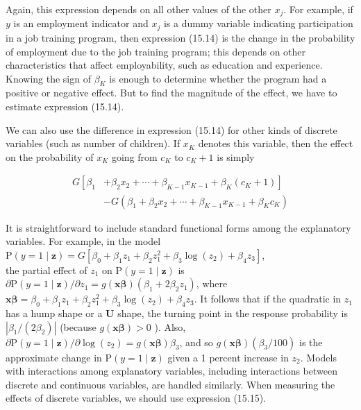 \documentclass[10pt]{article}
\begin{document}
Again, this expression depends on all other values of the other $x_{j}$. For example, if $y$ is an employment indicator and $x_{j}$ is a dummy variable indicating participation in a job training program, then expression (15.14) is the change in the probability of employment due to the job training program; this depends on other characteristics that affect employability, such as education and experience. Knowing the sign of $\beta_{K}$ is enough to determine whether the program had a positive or negative effect. But to find the magnitude of the effect, we have to estimate expression (15.14).

We can also use the difference in expression (15.14) for other kinds of discrete variables (such as number of children). If $x_{K}$ denotes this variable, then the effect on the probability of $x_{K}$ going from $c_{K}$ to $c_{K}+1$ is simply


\begin{align*}
G\left[\beta_{1}\right. & \left.+\beta_{2} x_{2}+\cdots+\beta_{K-1} x_{K-1}+\beta_{K}\left(c_{K}+1\right)\right] \\
& -G\left(\beta_{1}+\beta_{2} x_{2}+\cdots+\beta_{K-1} x_{K-1}+\beta_{K} c_{K}\right) \tag{15.15}
\end{align*}


It is straightforward to include standard functional forms among the explanatory variables. For example, in the model\\
$\mathrm{P}(y=1 \mid \mathbf{z})=G\left[\beta_{0}+\beta_{1} z_{1}+\beta_{2} z_{1}^{2}+\beta_{3} \log \left(z_{2}\right)+\beta_{4} z_{3}\right]$,\\
the partial effect of $z_{1}$ on $\mathrm{P}(y=1 \mid \mathbf{z})$ is $\partial \mathrm{P}(y=1 \mid \mathbf{z}) / \partial z_{1}=g(\mathbf{x} \boldsymbol{\beta})\left(\beta_{1}+2 \beta_{2} z_{1}\right)$, where $\mathbf{x} \boldsymbol{\beta}=\beta_{0}+\beta_{1} z_{1}+\beta_{2} z_{1}^{2}+\beta_{3} \log \left(z_{2}\right)+\beta_{4} z_{3}$. It follows that if the quadratic in $z_{1}$ has a hump shape or a $\mathbf{U}$ shape, the turning point in the response probability is $\left|\beta_{1} /\left(2 \beta_{2}\right)\right|$ (because $g(\mathbf{x} \boldsymbol{\beta})>0$ ). Also, $\partial \mathrm{P}(y=1 \mid \mathbf{z}) / \partial \log \left(z_{2}\right)=g(\mathbf{x} \boldsymbol{\beta}) \beta_{3}$, and so $g(\mathbf{x} \boldsymbol{\beta})\left(\beta_{3} / 100\right)$ is the approximate change in $\mathrm{P}(y=1 \mid \mathbf{z})$ given a 1 percent increase in $z_{2}$. Models with interactions among explanatory variables, including interactions between discrete and continuous variables, are handled similarly. When measuring the effects of discrete variables, we should use expression (15.15).
\end{document}
